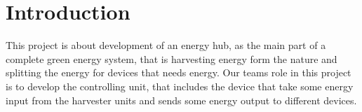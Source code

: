 \renewcommand{\contentsname}{Table of Content}
\tableofcontents

\newpage
\section{Introduction}
This project is about development of an energy hub, as the main part of a complete green energy system, that is harvesting energy form the nature and splitting the energy for devices that needs energy. Our teams role in this project is to develop the controlling unit, that includes the device that take some energy input from the harvester units and sends some energy output to different devices.
\newpage
